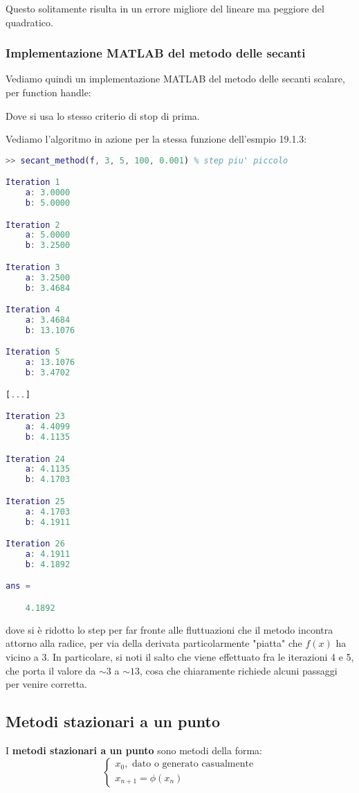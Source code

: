 \documentclass[a4paper,11pt]{article}
\begin{document}
Questo solitamente risulta in un errore migliore del lineare ma peggiore del quadratico.

\subsubsection{Implementazione MATLAB del metodo delle secanti}
Vediamo quindi un implementazione MATLAB del metodo delle secanti scalare, per function handle:


Dove si usa lo stesso criterio di stop di prima.

\par\smallskip

Vediamo l'algoritmo in azione per la stessa funzione dell'esmpio 19.1.3:
\begin{lstlisting}[language=MATLAB, style=codestyle]	
>> secant_method(f, 3, 5, 100, 0.001) % step piu' piccolo

Iteration 1
	a: 3.0000
	b: 5.0000

Iteration 2
	a: 5.0000
	b: 3.2500

Iteration 3
	a: 3.2500
	b: 3.4684

Iteration 4
	a: 3.4684
	b: 13.1076

Iteration 5
	a: 13.1076
	b: 3.4702

[...]

Iteration 23
	a: 4.4099
	b: 4.1135

Iteration 24
	a: 4.1135
	b: 4.1703

Iteration 25
	a: 4.1703
	b: 4.1911

Iteration 26
	a: 4.1911
	b: 4.1892

ans =

    4.1892
\end{lstlisting}
dove si è ridotto lo step per far fronte alle fluttuazioni che il metodo incontra attorno alla radice, per via della derivata particolarmente "piatta" che $f(x)$ ha vicino a 3.
In particolare, si noti il salto che viene effettuato fra le iterazioni 4 e 5, che porta il valore da $\sim 3$ a $\sim 13$, cosa che chiaramente richiede alcuni passaggi per venire corretta.

\subsection{Metodi stazionari a un punto}
I \textbf{metodi stazionari a un punto} sono metodi della forma:
\[
	\begin{cases}
		x_0, \text{ dato o generato casualmente} \\
		x_{n + 1} = \phi(x_n)
	\end{cases}
\]
\end{document}
